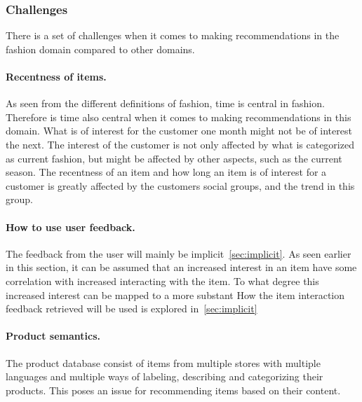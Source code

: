 \subsubsection{Challenges}
There is a set of challenges when it comes to making recommendations in the fashion domain compared to other domains.

\paragraph{Recentness of items.}
As seen from the different definitions of fashion, time is central in fashion.
Therefore is time also central when it comes to making recommendations in this domain.
What is of interest for the customer one month might not be of interest the next.
The interest of the customer is not only affected by what is categorized as current fashion, but might be affected by other aspects, such as the current season.
The recentness of an item and how long an item is of interest for a customer is greatly affected by the customers social groups, and the trend in this group.

\paragraph{How to use user feedback.}
The feedback from the user will mainly be implicit~\ref{sec:implicit}.
As seen earlier in this section, it can be assumed that an increased interest in an item have some correlation with increased interacting with the item.
To what degree this increased interest can be mapped to a more substant %
How the item interaction feedback retrieved will be used is explored in~\ref{sec:implicit}

\paragraph{Product semantics.}
The product database consist of items from multiple stores with multiple languages and multiple ways of labeling, describing and categorizing their products.
This poses an issue for recommending items based on their content.




